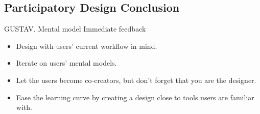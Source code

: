 \subsection{Participatory Design Conclusion}
GUSTAV. Mental model
Immediate feedback
\vspace{-5mm}
\begin{itemize}
\item Design with users' current workflow in mind.
\item Iterate on users' mental models.
\item Let the users become co-creators, but don’t forget that you are the designer.
\item Ease the learning curve by creating a design close to tools users are familiar with.
\end{itemize}
